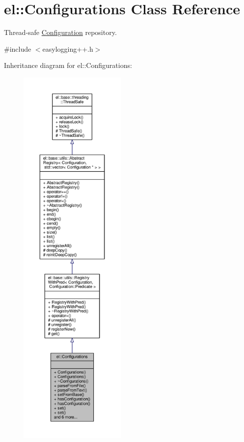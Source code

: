 \hypertarget{classel_1_1Configurations}{}\section{el\+:\+:Configurations Class Reference}
\label{classel_1_1Configurations}


Thread-\/safe \hyperlink{classel_1_1Configuration}{Configuration} repository.  




{\ttfamily \#include $<$easylogging++.\+h$>$}



Inheritance diagram for el\+:\+:Configurations\+:
\nopagebreak
\begin{figure}[H]
\begin{center}
\leavevmode
\includegraphics[height=550pt]{d3/d9b/classel_1_1Configurations__inherit__graph}
\end{center}
\end{figure}


